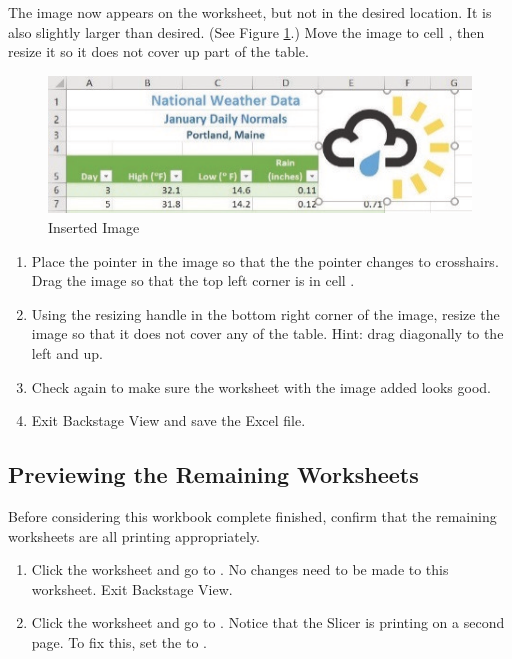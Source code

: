 The image now appears on the worksheet, but not in the desired location. It is also slightly larger than desired. (See Figure \ref{05:fig29}.) Move the image to cell , then resize it so it does not cover up part of the table.

\begin{figure}[H]
	\centering
	\includegraphics[width=\maxwidth{.95\linewidth}]{gfx/ch05_fig29}
	\caption{Inserted Image}
	\label{05:fig29}
\end{figure}

\begin{enumerate}
	\item Place the pointer in the image so that the the pointer changes to crosshairs. Drag the image so that the top left corner is in cell .
	\item Using the resizing handle in the bottom right corner of the image, resize the image so that it does not cover any of the table. Hint: drag diagonally to the left and up.
	\item Check  again to make sure the worksheet with the image added looks good.
\item Exit Backstage View and save the Excel file.
\end{enumerate}

\subsection{Previewing the Remaining Worksheets}

Before considering this workbook complete finished, confirm that the remaining worksheets are all printing appropriately.

\begin{enumerate}
	\item Click the  worksheet and go to . No changes need to be made to this worksheet. Exit Backstage View.
	\item Click the  worksheet and go to . Notice that the Slicer is printing on a second page. To fix this, set the  to .
\end{enumerate}

